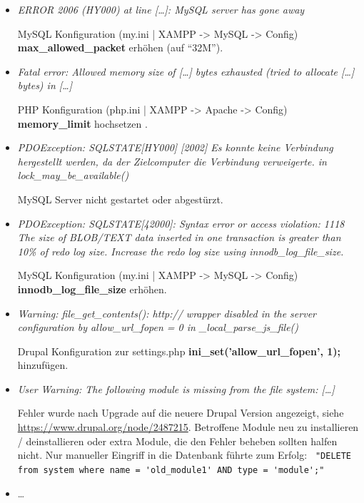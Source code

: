 \begin{itemize}[parsep=0pt, itemsep=5.0pt plus 2.0pt minus 1.0pt, leftmargin=*]
	\item \textit{ERROR 2006 (HY000) at line [\dots]: MySQL server has gone away}

	MySQL Konfiguration (my.ini | XAMPP -> MySQL -> Config)
	\textbf{max\_allowed\_packet} erhöhen (\zB auf \enquote{32M}).


	\item \textit{Fatal error: Allowed memory size of [\dots] bytes exhausted (tried to allocate [\dots] bytes) in [\dots]}

	PHP Konfiguration (php.ini | XAMPP -> Apache -> Config)
	\textbf{memory\_limit} hochsetzen .


	\item \textit{PDOException: SQLSTATE[HY000] [2002] Es konnte keine Verbindung hergestellt werden, da der Zielcomputer die Verbindung verweigerte. in lock\_may\_be\_available()}

	MySQL Server nicht gestartet oder abgestürzt.


	\item \textit{PDOException: SQLSTATE[42000]: Syntax error or access violation: 1118 The size of BLOB/TEXT data inserted in one transaction is greater than 10\% of redo log size. Increase the redo log size using innodb\_log\_file\_size.}

	MySQL Konfiguration (my.ini | XAMPP -> MySQL -> Config)
	\textbf{innodb\_log\_file\_size} erhöhen.


	\item \textit{Warning: file\_get\_contents(): http:// wrapper disabled in the server configuration by allow\_url\_fopen = 0 in \_local\_parse\_js\_file()}

	Drupal Konfiguration zur settings.php \textbf{ini\_set('allow\_url\_fopen', 1);} hinzufügen.


	\item \textit{User Warning: The following module is missing from the file system: [\dots]}

	Fehler wurde nach Upgrade auf die neuere Drupal Version angezeigt, siehe \url{https://www.drupal.org/node/2487215}.
	Betroffene Module neu zu installieren / deinstallieren oder extra Module, die den Fehler beheben sollten halfen nicht. Nur manueller Eingriff in die Datenbank führte zum Erfolg: \lstinline| "DELETE from system where name = 'old_module1' AND type = 'module';"|

	\item \dots {}
\end{itemize}



